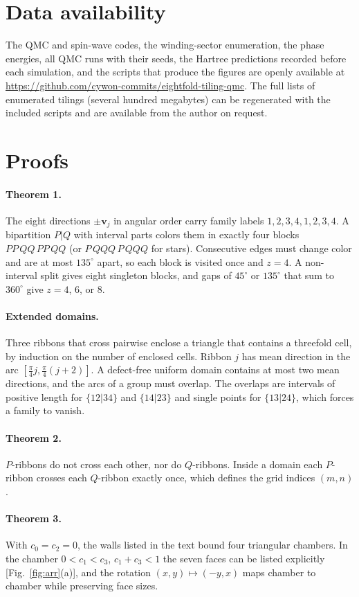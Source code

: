 \documentclass[aps,prb,twocolumn,superscriptaddress,floatfix]{revtex4-2}
\begin{document}
\section*{Data availability}
The QMC and spin-wave codes, the winding-sector enumeration, the phase energies, all QMC runs with their seeds, the Hartree predictions recorded before each simulation, and the scripts that produce the figures are openly available at \url{https://github.com/cywon-commits/eightfold-tiling-qmc}. The full lists of enumerated tilings (several hundred megabytes) can be regenerated with the included scripts and are available from the author on request.

\appendix

\section{Proofs}\label{app:proofs}
\paragraph*{Theorem 1.} The eight directions $\pm\mathbf v_j$ in angular order carry family labels $1,2,3,4,1,2,3,4$. A bipartition $P|Q$ with interval parts colors them in exactly four blocks $PP\,QQ\,PP\,QQ$ (or $P\,QQQ\,P\,QQQ$ for stars). Consecutive edges must change color and are at most $135^\circ$ apart, so each block is visited once and $z=4$. A non-interval split gives eight singleton blocks, and gaps of $45^\circ$ or $135^\circ$ that sum to $360^\circ$ give $z=4$, $6$, or $8$.
\paragraph*{Extended domains.} Three ribbons that cross pairwise enclose a triangle that contains a threefold cell, by induction on the number of enclosed cells. Ribbon $j$ has mean direction in the arc $[\frac{\pi}{4}j,\frac{\pi}{4}(j+2)]$. A defect-free uniform domain contains at most two mean directions, and the arcs of a group must overlap. The overlaps are intervals of positive length for $\{12|34\}$ and $\{14|23\}$ and single points for $\{13|24\}$, which forces a family to vanish.
\paragraph*{Theorem 2.} $P$-ribbons do not cross each other, nor do $Q$-ribbons. Inside a domain each $P$-ribbon crosses each $Q$-ribbon exactly once, which defines the grid indices $(m,n)$.
\paragraph*{Theorem 3.} With $c_0=c_2=0$, the walls listed in the text bound four triangular chambers. In the chamber $0<c_1<c_3$, $c_1+c_3<1$ the seven faces can be listed explicitly [Fig.~\ref{fig:arr}(a)], and the rotation $(x,y)\mapsto(-y,x)$ maps chamber to chamber while preserving face sizes.
\end{document}
